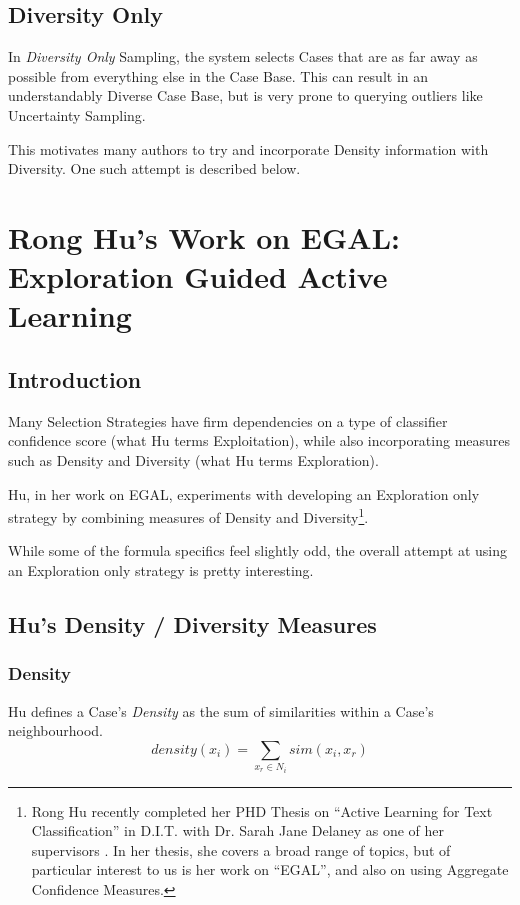 \documentclass[a4paper,11pt]{report}
\begin{document}
\subsection{Diversity Only}
In \emph{Diversity Only} Sampling, the system selects Cases that are as far away as possible from everything else in the Case Base. This can result in an understandably Diverse Case Base, but is very prone to querying outliers like Uncertainty Sampling.

This motivates many authors to try and incorporate Density information with Diversity. One such attempt is described below.

\section{Rong Hu's Work on EGAL: Exploration Guided Active Learning}
\subsection{Introduction}
Many Selection Strategies have firm dependencies on a type of classifier confidence score (what Hu terms Exploitation), while also incorporating measures such as Density and Diversity (what Hu terms Exploration).

Hu, in her work on EGAL, experiments with developing an Exploration only strategy by combining measures of Density and Diversity\footnote{Rong Hu recently completed her PHD Thesis on ``Active Learning for Text Classification'' in D.I.T. with Dr. Sarah Jane Delaney as one of her supervisors \citep{Hu2011}. In her thesis, she covers a broad range of topics, but of particular interest to us is her work on ``EGAL'', and also on using Aggregate Confidence Measures.}.

While some of the formula specifics feel slightly odd, the overall attempt at using an Exploration only strategy is pretty interesting. 

\subsection{Hu's Density / Diversity Measures}

\subsubsection{Density}
Hu defines a Case's \emph{Density} as the sum of similarities within a Case's neighbourhood.
\[
density(x_{i})=\underset{x_{r}\in N_{i}}{\sum}sim(x_{i},x_{r})
\]
\end{document}

